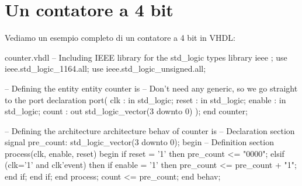 \documentclass[10pt,a4paper,oneside]{scrbook}
\begin{document}
\section{Un contatore a 4 bit}
Vediamo un esempio completo di un contatore a 4 bit in VHDL:
\begin{vhdl}{counter.vhdl}
-- Including IEEE library for the std_logic types
library ieee ;
use ieee.std_logic_1164.all;
use ieee.std_logic_unsigned.all;

-- Defining the entity
entity counter is
    -- Don't need any generic, so we go straight to the port declaration
    port(
        clk     :  in   std_logic;
        reset   :  in   std_logic;
        enable  :  in   std_logic;
        count   :  out  std_logic_vector(3 downto 0)
    );
end counter;

-- Defining the architecture
architecture behav of counter is
    -- Declaration section       
    signal pre_count: std_logic_vector(3 downto 0);
begin
    -- Definition section
    process(clk, enable, reset)
    begin
        if reset = '1' then
            pre_count <= "0000";
        elsif (clk='1' and clk'event) then
            if enable = '1' then
              pre_count <= pre_count + "1";
            end if;
        end if;
    end process;  
    count <= pre_count;
end behav;
\end{vhdl}
\end{document}
